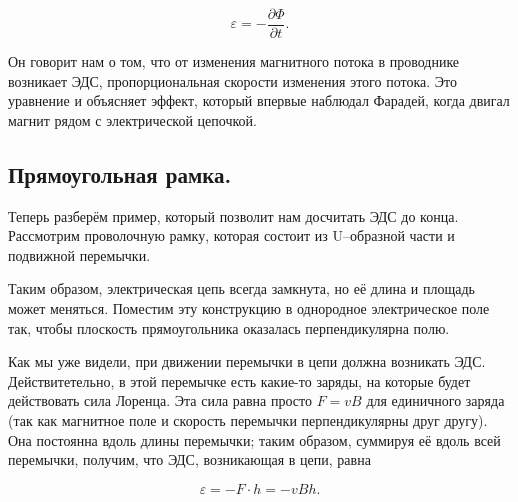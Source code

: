 \documentclass[a4paper,12pt]{article}
\newcommand{\pt}{\partial}
\newcommand{\vareps}{\varepsilon}
\begin{document}
\begin{equation}
  \label{eq:eds_5}
  \vareps = - \frac{\pt \Phi}{\pt t}.
\end{equation}

Он говорит нам о том, что от изменения магнитного потока в проводнике
возникает ЭДС, пропорциональная скорости изменения этого потока. Это
уравнение и объясняет эффект, который впервые наблюдал Фарадей, когда
двигал магнит рядом с электрической цепочкой. 

\subsection{Прямоугольная рамка.}
\label{sec:rectangle}

Теперь разберём пример, который позволит нам досчитать ЭДС до
конца. Рассмотрим проволочную рамку, которая состоит из U--образной
части и подвижной перемычки. 

\begin{figure}[h]
  \centering
  \label{fig:rect_b_field}
\end{figure}

Таким образом, электрическая цепь всегда замкнута, но её длина и
площадь может меняться. Поместим эту конструкцию в однородное
электрическое поле так, чтобы плоскость прямоугольника оказалась
перпендикулярна полю. 

Как мы уже видели, при движении перемычки в цепи должна возникать
ЭДС. Действитетельно, в этой перемычке есть какие-то заряды, на
которые будет действовать сила Лоренца. Эта сила равна просто $F = vB$
для единичного заряда (так как магнитное поле и скорость перемычки
перпендикулярны друг другу). Она постоянна вдоль длины перемычки;
таким образом, суммируя её вдоль всей перемычки, получим, что ЭДС,
возникающая в цепи, равна

\begin{equation}
  \label{eq:rect_eds_1}
  \vareps = - F \cdot h = - v B h.
\end{equation}
\end{document}
